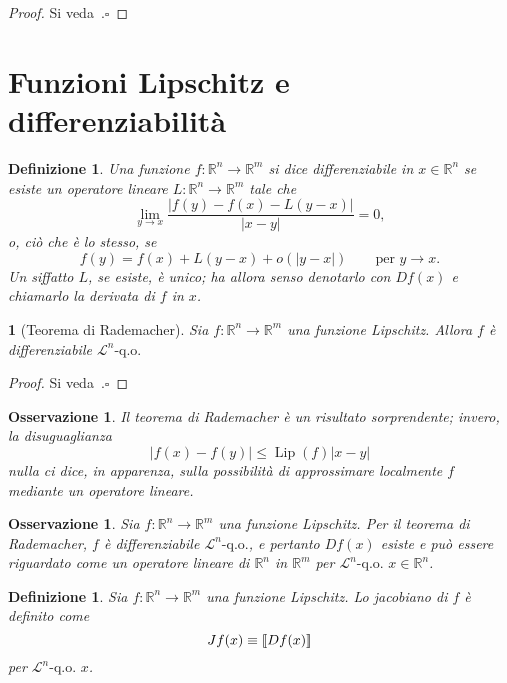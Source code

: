 \documentclass[a4paper,10pt,openright,oneside]{book}
\theoremstyle{theoremstyle}
\theoremstyle{theoremstylewoheader}
\newtheorem{teorema2}[teorema]{}
\theoremstyle{theoremstyle}
\newtheorem{definizione}[teorema]{Definizione}
\newtheorem{osservazione}[teorema]{Osservazione}
\theoremstyle{proofsecstyle}
\theoremstyle{nonumberplain}
\newtheorem{proof}{Dim.}
\newcommand{\RR}{\ensuremath{\mathbb{R}}}
\newcommand{\Leb}{\ensuremath{\mathcal{L}}}
\newcommand{\abs}[1]{\ensuremath{\lvert #1 \rvert}}
\newcommand{\jacobian}[1]{\ensuremath{[\kern-1.7pt[#1]\kern-1.7pt]}}
\newcommand{\qo}[1]{\ensuremath{#1\text{-q.o.}}}
\newcommand{\qogni}[2]{\ensuremath{#2\text{-q.o. $\!#1$}}}
\newcommand{\smalloh}{\ensuremath{o}}
\DeclareMathOperator{\Lip}{Lip}
\renewcommand{\qedsymbol}{\ensuremath{\square}}
\newcommand{\qed}{\unskip\nobreak\hfill\nobreak\hspace{.5em}\qedsymbol}
\begin{document}
\begin{proof}
Si veda~\cite[Theorem~4, Section~3.2, pag.~89]{evans}.\qed
\end{proof}

\section{Funzioni Lipschitz e differenziabilità}

\begin{definizione}
\label{def:funzione_differenziabile}
Una funzione $f : \RR^n \rightarrow \RR^m$ si dice \emph{differenziabile} in $x \in \RR^n$ se esiste un operatore lineare $L : \RR^n \rightarrow \RR^m$ tale che
\[
\lim_{y \to x} \frac{\abs{f(y) - f(x) - L(y-x)}}{\abs{x-y}} = 0,
\]
o, ciò che è lo stesso, se
\[
f(y) = f(x) + L(y-x) + \smalloh(\abs{y-x})\qquad\text{per $y \to x$}.
\]
Un siffatto $L$, se esiste, è unico; ha allora senso denotarlo con $Df(x)$ e chiamarlo la \emph{derivata} di $f$ in $x$.
\end{definizione}

\begin{teorema2}[Teorema di Rademacher]
\label{thm:rademacher}
Sia $f : \RR^n \rightarrow \RR^m$ una funzione Lipschitz. Allora $f$ è differenziabile $\qo{\Leb^n}$
\end{teorema2}

\begin{proof}
Si veda~\cite[Theorem~2, Section~3.1.2, pag.~81]{evans}.\qed
\end{proof}

\begin{osservazione}
Il teorema di Rademacher è un risultato sorprendente; invero, la disuguaglianza
\[
\abs{f(x)-f(y)}\le\Lip(f)\abs{x-y}
\]
nulla ci dice, in apparenza, sulla possibilità di approssimare localmente $f$ mediante un operatore lineare.
\end{osservazione}

\begin{osservazione}
Sia $f : \RR^n \rightarrow \RR^m$ una funzione Lipschitz. Per il teorema di Rademacher, $f$ è differenziabile $\qo{\Leb^n}$, e pertanto $Df(x)$ esiste e può essere riguardato come un operatore lineare di $\RR^n$ in $\RR^m$ per $\qogni{x \in \RR^n}{\Leb^n}$.
\end{osservazione}

\begin{definizione}
\label{def:jacobiano_di_f}
Sia $f : \RR^n \rightarrow \RR^m$ una funzione Lipschitz. Lo \emph{jacobiano} di $f$ è definito come 
\[
Jf(x) \equiv \jacobian{Df(x)}
\]
per $\qogni{x}{\Leb^n}$.
\end{definizione}
\end{document}
